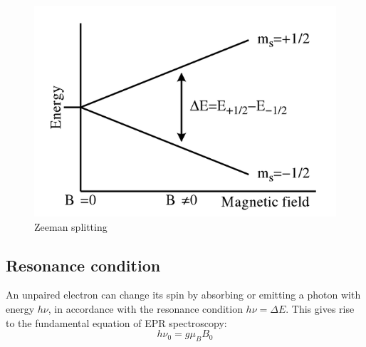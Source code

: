 \documentclass{article}
\begin{document}
\begin{figure}[h]
    \centering
    \includegraphics[width=0.5\linewidth]{Figures/Intro/1.png}
    \caption{Zeeman splitting \cite{wikipediacontributors_2019_electron}}
    \label{fig:zeeman}
\end{figure}

\subsection{Resonance condition}
An unpaired electron can change its spin by absorbing or emitting a photon with energy $h\nu$, in accordance with the resonance condition $h\nu=\Delta E$. This gives rise to the fundamental equation of EPR spectroscopy: 
\begin{equation}
	h {\nu}_0 = g \mu_B B_0
	\label{eq:resonancecondition}
\end{equation}

\pagebreak{}
\end{document}
